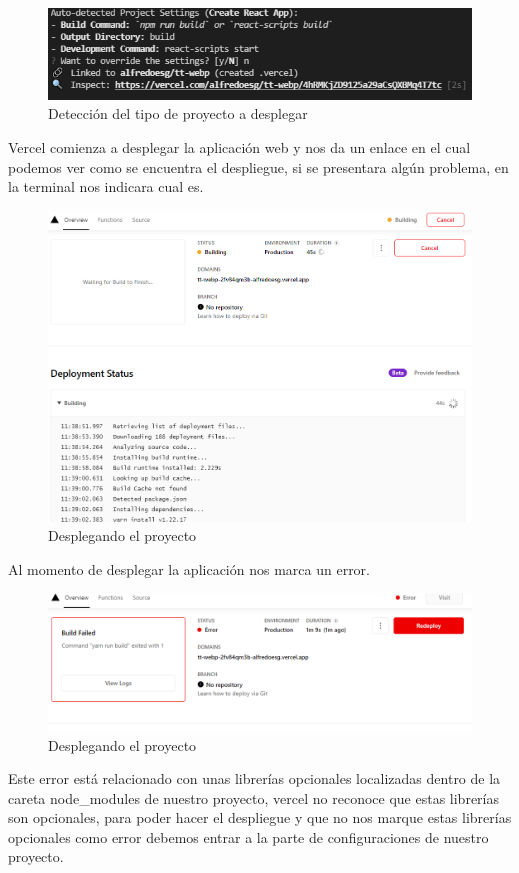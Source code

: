 \documentclass[12pt, a4paper, titlepage]{article}
\begin{document}
	\begin{figure}[H]
		\includegraphics[width=12cm]{./Imagenes/Despliegue/Deteccion.png}
		\centering 
		\caption{Detección del tipo de proyecto a desplegar}
	\end{figure}
	Vercel comienza a desplegar la aplicación web y nos da un enlace en el cual podemos ver como se encuentra el despliegue, si se presentara algún problema, en la terminal nos indicara cual es.
	\begin{figure}[H]
		\includegraphics[width=12cm]{./Imagenes/Despliegue/Desplegando.png}
		\centering 
		\caption{Desplegando el proyecto}
	\end{figure}
	Al momento de desplegar la aplicación nos marca un error.
	\begin{figure}[H]
		\includegraphics[width=12cm]{./Imagenes/Despliegue/Error.png}
		\centering 
		\caption{Desplegando el proyecto}
	\end{figure}
	Este error está relacionado con unas librerías opcionales localizadas dentro de la careta node\_modules de nuestro proyecto, vercel no reconoce que estas librerías son opcionales, para poder hacer el despliegue y que no nos marque estas librerías opcionales como error debemos entrar a la parte de configuraciones de nuestro proyecto.	
\end{document}
